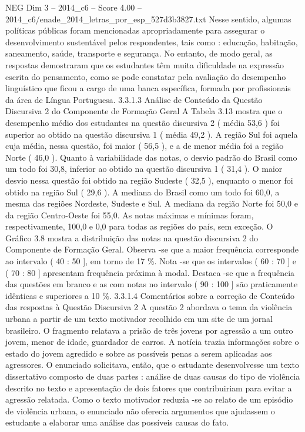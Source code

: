 \begin{textsample}{NEG Dim 3 – 2014\_c6 – Score 4.00 – 2014\_c6/enade\_2014\_letras\_por\_esp\_527d3b3827.txt}
Nesse sentido, algumas políticas públicas foram mencionadas apropriadamente para assegurar o desenvolvimento sustentável pelos respondentes, tais como : educação, habitação, saneamento, saúde, transporte e segurança.
No entanto, de modo geral, as respostas demostraram que os estudantes têm muita dificuldade na expressão escrita do pensamento, como se pode constatar pela avaliação do desempenho linguístico que ficou a cargo de uma banca específica, formada por profissionais da área de Língua Portuguesa. 3.3.1.3 Análise de Conteúdo da Questão Discursiva 2 do Componente de Formação Geral A Tabela 3.13 mostra que o desempenho médio dos estudantes na questão discursiva 2 ( média 53,6 ) foi superior ao obtido na questão discursiva 1 ( média 49,2 ).
A região Sul foi aquela cuja média, nessa questão, foi maior ( 56,5 ), e a de menor média foi a região Norte ( 46,0 ).
Quanto à variabilidade das notas, o desvio padrão do Brasil como um todo foi 30,8, inferior ao obtido na questão discursiva 1 ( 31,4 ).
O maior desvio nessa questão foi obtido na região Sudeste ( 32,5 ), enquanto o menor foi obtido na região Sul ( 29,6 ).
A mediana do Brasil como um todo foi 60,0, a mesma das regiões Nordeste, Sudeste e Sul.
A mediana da região Norte foi 50,0 e da região Centro-Oeste foi 55,0.
As notas máximas e mínimas foram, respectivamente, 100,0 e 0,0 para todas as regiões do país, sem exceção.
O Gráfico 3.8 mostra a distribuição das notas na questão discursiva 2 do Componente de Formação Geral.
Observa -se que a maior frequência corresponde ao intervalo ( 40 : 50 ], em torno de 17 \%.
Nota -se que os intervalos ( 60 : 70 ] e ( 70 : 80 ] apresentam frequência próxima à modal.
Destaca -se que a frequência das questões em branco e as com notas no intervalo ( 90 : 100 ] são praticamente idênticas e superiores a 10 \%. 3.3.1.4 Comentários sobre a correção de Conteúdo das respostas à Questão Discursiva 2 A questão 2 abordava o tema da violência urbana a partir de um texto motivador recolhido em um site de um jornal brasileiro.
O fragmento relatava a prisão de três jovens por agressão a um outro jovem, menor de idade, guardador de carros.
A notícia trazia informações sobre o estado do jovem agredido e sobre as possíveis penas a serem aplicadas aos agressores.
O enunciado solicitava, então, que o estudante desenvolvesse um texto dissertativo composto de duas partes : análise de duas causas do tipo de violência descrito no texto e apresentação de dois fatores que contribuiriam para evitar a agressão relatada.
Como o texto motivador reduzia -se ao relato de um episódio de violência urbana, o enunciado não oferecia argumentos que ajudassem o estudante a elaborar uma análise das possíveis causas do fato.

\end{textsample}
